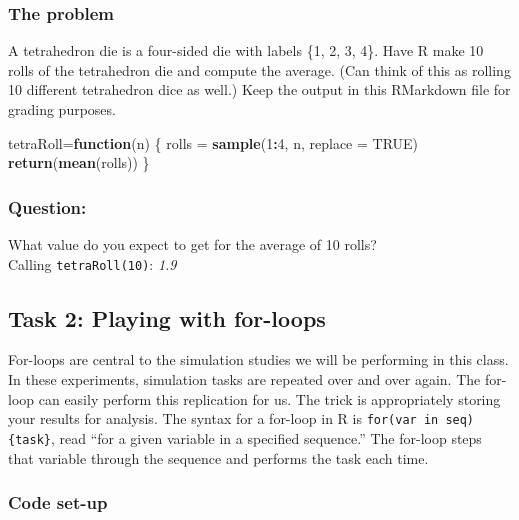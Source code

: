 \documentclass[
]{article}
\newenvironment{Shaded}{\begin{snugshade}}{\end{snugshade}}
\newcommand{\ControlFlowTok}[1]{\textcolor[rgb]{0.13,0.29,0.53}{\textbf{#1}}}
\newcommand{\DataTypeTok}[1]{\textcolor[rgb]{0.13,0.29,0.53}{#1}}
\newcommand{\DecValTok}[1]{\textcolor[rgb]{0.00,0.00,0.81}{#1}}
\newcommand{\KeywordTok}[1]{\textcolor[rgb]{0.13,0.29,0.53}{\textbf{#1}}}
\newcommand{\NormalTok}[1]{#1}
\newcommand{\OperatorTok}[1]{\textcolor[rgb]{0.81,0.36,0.00}{\textbf{#1}}}
\newcommand{\OtherTok}[1]{\textcolor[rgb]{0.56,0.35,0.01}{#1}}
\newcommand{\StringTok}[1]{\textcolor[rgb]{0.31,0.60,0.02}{#1}}
\begin{document}
\hypertarget{the-problem}{%
\subsubsection{The problem}\label{the-problem}}

A tetrahedron die is a four-sided die with labels \{1, 2, 3, 4\}. Have R
make 10 rolls of the tetrahedron die and compute the average. (Can think
of this as rolling 10 different tetrahedron dice as well.) Keep the
output in this RMarkdown file for grading purposes.

\begin{Shaded}
\begin{Highlighting}[]
\NormalTok{tetraRoll=}\ControlFlowTok{function}\NormalTok{(n)}
\NormalTok{\{}
\NormalTok{  rolls =}\StringTok{ }\KeywordTok{sample}\NormalTok{(}\DecValTok{1}\OperatorTok{:}\DecValTok{4}\NormalTok{, n, }\DataTypeTok{replace =} \OtherTok{TRUE}\NormalTok{)}
  \KeywordTok{return}\NormalTok{(}\KeywordTok{mean}\NormalTok{(rolls))}
\NormalTok{\}}
\end{Highlighting}
\end{Shaded}

\hypertarget{question}{%
\subsubsection{Question:}\label{question}}

What value do you expect to get for the average of 10 rolls?\\
Calling \texttt{tetraRoll(10)}: \emph{1.9}

\hypertarget{task-2-playing-with-for-loops}{%
\subsection{Task 2: Playing with
for-loops}\label{task-2-playing-with-for-loops}}

For-loops are central to the simulation studies we will be performing in
this class. In these experiments, simulation tasks are repeated over and
over again. The for-loop can easily perform this replication for us. The
trick is appropriately storing your results for analysis. The syntax for
a for-loop in R is \texttt{for(var\ in\ seq)\{task\}}, read ``for a
given variable in a specified sequence.'' The for-loop steps that
variable through the sequence and performs the task each time.

\hypertarget{code-set-up-1}{%
\subsubsection{Code set-up}\label{code-set-up-1}}
\end{document}
